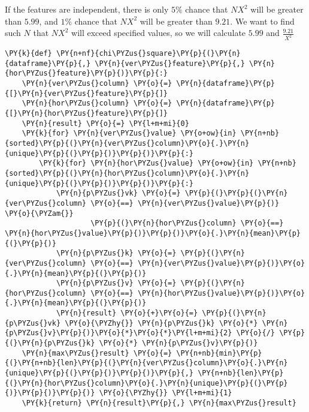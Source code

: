     If the features are independent, there is only \(5\%\) chance that
\(NX^2\) will be greater than \(5.99\), and \(1\%\) chance that \(NX^2\)
will be greater than \(9.21\). We want to find such \(N\) that \(NX^2\)
will exceed specified values, so we will calculate \(5.99\) and
\(\frac{9.21}{X^2}\)

    \begin{tcolorbox}[breakable, size=fbox, boxrule=1pt, pad at break*=1mm,colback=cellbackground, colframe=cellborder]
\begin{Verbatim}[commandchars=\\\{\}]
\PY{k}{def} \PY{n+nf}{chi\PYZus{}square}\PY{p}{(}\PY{n}{dataframe}\PY{p}{,} \PY{n}{ver\PYZus{}feature}\PY{p}{,} \PY{n}{hor\PYZus{}feature}\PY{p}{)}\PY{p}{:}
    \PY{n}{ver\PYZus{}column} \PY{o}{=} \PY{n}{dataframe}\PY{p}{[}\PY{n}{ver\PYZus{}feature}\PY{p}{]}
    \PY{n}{hor\PYZus{}column} \PY{o}{=} \PY{n}{dataframe}\PY{p}{[}\PY{n}{hor\PYZus{}feature}\PY{p}{]}
    \PY{n}{result} \PY{o}{=} \PY{l+m+mi}{0}
    \PY{k}{for} \PY{n}{ver\PYZus{}value} \PY{o+ow}{in} \PY{n+nb}{sorted}\PY{p}{(}\PY{n}{ver\PYZus{}column}\PY{o}{.}\PY{n}{unique}\PY{p}{(}\PY{p}{)}\PY{p}{)}\PY{p}{:}
        \PY{k}{for} \PY{n}{hor\PYZus{}value} \PY{o+ow}{in} \PY{n+nb}{sorted}\PY{p}{(}\PY{n}{hor\PYZus{}column}\PY{o}{.}\PY{n}{unique}\PY{p}{(}\PY{p}{)}\PY{p}{)}\PY{p}{:}
            \PY{n}{p\PYZus{}vk} \PY{o}{=} \PY{p}{(}\PY{p}{(}\PY{n}{ver\PYZus{}column} \PY{o}{==} \PY{n}{ver\PYZus{}value}\PY{p}{)} \PY{o}{\PYZam{}}
                    \PY{p}{(}\PY{n}{hor\PYZus{}column} \PY{o}{==} \PY{n}{hor\PYZus{}value}\PY{p}{)}\PY{p}{)}\PY{o}{.}\PY{n}{mean}\PY{p}{(}\PY{p}{)}
            \PY{n}{p\PYZus{}k} \PY{o}{=} \PY{p}{(}\PY{n}{ver\PYZus{}column} \PY{o}{==} \PY{n}{ver\PYZus{}value}\PY{p}{)}\PY{o}{.}\PY{n}{mean}\PY{p}{(}\PY{p}{)}
            \PY{n}{p\PYZus{}v} \PY{o}{=} \PY{p}{(}\PY{n}{hor\PYZus{}column} \PY{o}{==} \PY{n}{hor\PYZus{}value}\PY{p}{)}\PY{o}{.}\PY{n}{mean}\PY{p}{(}\PY{p}{)}
            \PY{n}{result} \PY{o}{+}\PY{o}{=} \PY{p}{(}\PY{n}{p\PYZus{}vk} \PY{o}{\PYZhy{}} \PY{n}{p\PYZus{}k} \PY{o}{*} \PY{n}{p\PYZus{}v}\PY{p}{)}\PY{o}{*}\PY{o}{*}\PY{l+m+mi}{2} \PY{o}{/} \PY{p}{(}\PY{n}{p\PYZus{}k} \PY{o}{*} \PY{n}{p\PYZus{}v}\PY{p}{)}
    \PY{n}{max\PYZus{}result} \PY{o}{=} \PY{n+nb}{min}\PY{p}{(}\PY{n+nb}{len}\PY{p}{(}\PY{n}{ver\PYZus{}column}\PY{o}{.}\PY{n}{unique}\PY{p}{(}\PY{p}{)}\PY{p}{)}\PY{p}{,} \PY{n+nb}{len}\PY{p}{(}\PY{n}{hor\PYZus{}column}\PY{o}{.}\PY{n}{unique}\PY{p}{(}\PY{p}{)}\PY{p}{)}\PY{p}{)} \PY{o}{\PYZhy{}} \PY{l+m+mi}{1}
    \PY{k}{return} \PY{n}{result}\PY{p}{,} \PY{n}{max\PYZus{}result}
\end{Verbatim}
\end{tcolorbox}

